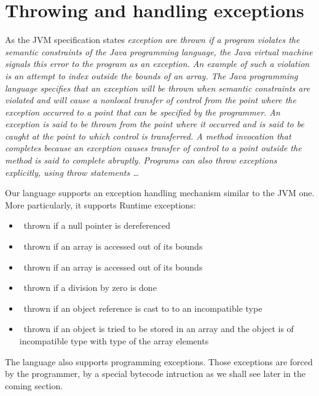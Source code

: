 \section{Throwing and handling exceptions}\label{opSem:exc}

As the JVM specification states \textit{exception are thrown if a program violates the semantic constraints of the Java programming language,
 the Java virtual machine signals this error to the program as an exception. An example of such a violation is an 
attempt to index outside the bounds of an array. The Java programming language specifies that an exception will be thrown when
 semantic constraints are violated and will cause a nonlocal transfer of control from the point where the exception occurred to
 a point that can be specified by the programmer. An exception is said to be thrown from the point where it occurred and is said to be
 caught at the point to which control is transferred. A method invocation that completes because an exception causes transfer of
 control to a point outside the method is said to complete abruptly. Programs can also throw exceptions explicitly, using throw statements \ldots }

Our language supports an exception handling mechanism similar to the JVM one.
 More particularly, it supports  Runtime exceptions: 
 \begin{itemize}
   \item \NullPointerExc \ thrown if a null pointer is dereferenced
   \item \NegativeArraySizeExc \ thrown if an array is accessed out of its bounds
   \item \ArrIndexOutOfBoundExc \ thrown if an array is accessed out of its bounds
   \item \ArithExc \ thrown if a division by zero is done
   \item \ClassCastExc \ thrown if an object reference is cast to to an incompatible type
   \item \ArrStoreExc \ thrown if an object is tried to be stored in an array and the object is of incompatible type with type of the  array elements
\end{itemize}

The language also supports programming exceptions. Those exceptions are forced by the programmer, by a special bytecode 
intruction as we shall see later in the coming section. 

